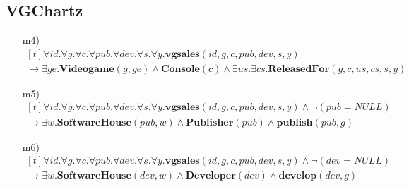 \subsection*{VGChartz}
\begin{itemize}
	\item[m4)]
	$ \begin{aligned}[t]
		\forall id. \forall g. \forall c. \forall pub. \forall dev. \forall s. \forall y.\textbf{vgsales}(id,g,c,pub,dev,s,y) \hspace{150pt} \\
		\rightarrow \exists ge.\textbf{Videogame}(g,ge) \wedge \textbf{Console}(c) \wedge \exists us.\exists cs.\textbf{ReleasedFor}(g,c,us,cs, s,y)
	\end{aligned} $
	\item[m5)]
	$ \begin{aligned}[t]
		\forall id. \forall g. \forall c. \forall pub. \forall dev. \forall s. \forall y.\textbf{vgsales}(id,g,c,pub,dev,s,y) \wedge \neg(pub=NULL) \\
		\rightarrow \exists
	w.\textbf{SoftwareHouse}(pub,w) \wedge \textbf{Publisher}(pub) \wedge \textbf{publish}(pub,g)
	\end{aligned} $
	\item[m6)]
	$ \begin{aligned}[t]
		\forall id. \forall g. \forall c. \forall pub. \forall dev. \forall s. \forall y.\textbf{vgsales}(id,g,c,pub,dev,s,y) \wedge \neg(dev=NULL) \\
		\rightarrow \exists
	w.\textbf{SoftwareHouse}(dev,w) \wedge \textbf{Developer}(dev) \wedge \textbf{develop}(dev,g)
	\end{aligned} $
\end{itemize}

